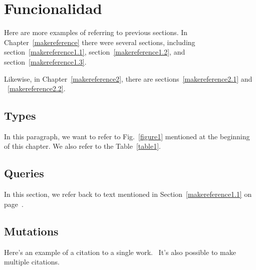 
\cleardoublepage


\chapter{Funcionalidad}
\label{makereference5}

Here are more examples of referring to previous sections.  In
Chapter~\ref{makereference} there were several sections, including
section~\ref{makereference1.1}, section~\ref{makereference1.2},
and section~\ref{makereference1.3}.

Likewise, in Chapter~\ref{makereference2}, there are
sections~\ref{makereference2.1} and ~\ref{makereference2.2}.





\section{Types}
\label{makereference5.1}

In this paragraph, we want to refer to Fig.~\ref{figure1}
mentioned at the beginning of this chapter.  We also refer to the
Table~\ref{table1}.

\section{Queries}
\label{makereference5.2}

In this section, we refer back to text mentioned in
Section~\ref{makereference1.1} on page~\pageref{makereference1.1}.

\section{Mutations}
\label{makereference5.3}

Here's an example of a citation to a single
work.~\citet{CT:Weiner:1999} It's also possible to make multiple
citations.~\citet{CT:Phillips:1985, ARP:Loy:1974}
